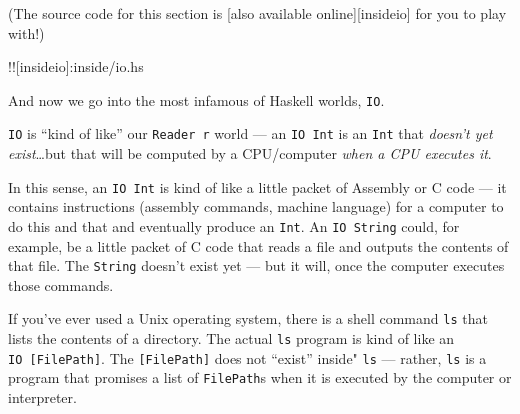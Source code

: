 \documentclass[]{article}
\begin{document}
(The source code for this section is {[}also available
online{]}{[}insideio{]} for you to play with!)

!!{[}insideio{]}:inside/io.hs

And now we go into the most infamous of Haskell worlds, \texttt{IO}.

\texttt{IO} is ``kind of like'' our \texttt{Reader\ r} world --- an
\texttt{IO\ Int} is an \texttt{Int} that \emph{doesn't yet
exist}\ldots{}but that will be computed by a CPU/computer \emph{when a
CPU executes it}.

In this sense, an \texttt{IO\ Int} is kind of like a little packet of
Assembly or C code --- it contains instructions (assembly commands,
machine language) for a computer to do this and that and eventually
produce an \texttt{Int}. An \texttt{IO\ String} could, for example, be a
little packet of C code that reads a file and outputs the contents of
that file. The \texttt{String} doesn't exist yet --- but it will, once
the computer executes those commands.

If you've ever used a Unix operating system, there is a shell command
\texttt{ls} that lists the contents of a directory. The actual
\texttt{ls} program is kind of like an \texttt{IO\ {[}FilePath{]}}. The
\texttt{{[}FilePath{]}} does not ``exist'' inside" \texttt{ls} ---
rather, \texttt{ls} is a program that promises a list of
\texttt{FilePath}s when it is executed by the computer or interpreter.
\end{document}
